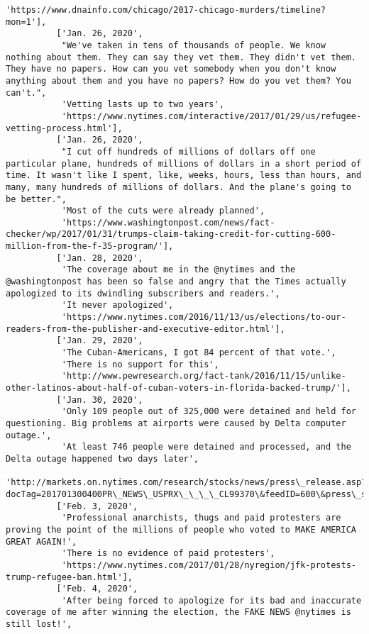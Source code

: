 \documentclass[11pt]{article}
\begin{document}
\begin{Verbatim}[commandchars=\\\{\}]
           'https://www.dnainfo.com/chicago/2017-chicago-murders/timeline?mon=1'],
          ['Jan. 26, 2020',
           "We've taken in tens of thousands of people. We know nothing about them. They can say they vet them. They didn't vet them. They have no papers. How can you vet somebody when you don't know anything about them and you have no papers? How do you vet them? You can't.",
           'Vetting lasts up to two years',
           'https://www.nytimes.com/interactive/2017/01/29/us/refugee-vetting-process.html'],
          ['Jan. 26, 2020',
           "I cut off hundreds of millions of dollars off one particular plane, hundreds of millions of dollars in a short period of time. It wasn't like I spent, like, weeks, hours, less than hours, and many, many hundreds of millions of dollars. And the plane's going to be better.",
           'Most of the cuts were already planned',
           'https://www.washingtonpost.com/news/fact-checker/wp/2017/01/31/trumps-claim-taking-credit-for-cutting-600-million-from-the-f-35-program/'],
          ['Jan. 28, 2020',
           'The coverage about me in the @nytimes and the @washingtonpost has been so false and angry that the Times actually apologized to its dwindling subscribers and readers.',
           'It never apologized',
           'https://www.nytimes.com/2016/11/13/us/elections/to-our-readers-from-the-publisher-and-executive-editor.html'],
          ['Jan. 29, 2020',
           'The Cuban-Americans, I got 84 percent of that vote.',
           'There is no support for this',
           'http://www.pewresearch.org/fact-tank/2016/11/15/unlike-other-latinos-about-half-of-cuban-voters-in-florida-backed-trump/'],
          ['Jan. 30, 2020',
           'Only 109 people out of 325,000 were detained and held for questioning. Big problems at airports were caused by Delta computer outage.',
           'At least 746 people were detained and processed, and the Delta outage happened two days later',
           'http://markets.on.nytimes.com/research/stocks/news/press\_release.asp?docTag=201701300400PR\_NEWS\_USPRX\_\_\_\_CL99370\&feedID=600\&press\_symbol=7311173'],
          ['Feb. 3, 2020',
           'Professional anarchists, thugs and paid protesters are proving the point of the millions of people who voted to MAKE AMERICA GREAT AGAIN!',
           'There is no evidence of paid protesters',
           'https://www.nytimes.com/2017/01/28/nyregion/jfk-protests-trump-refugee-ban.html'],
          ['Feb. 4, 2020',
           'After being forced to apologize for its bad and inaccurate coverage of me after winning the election, the FAKE NEWS @nytimes is still lost!',

\end{Verbatim}
\end{document}
